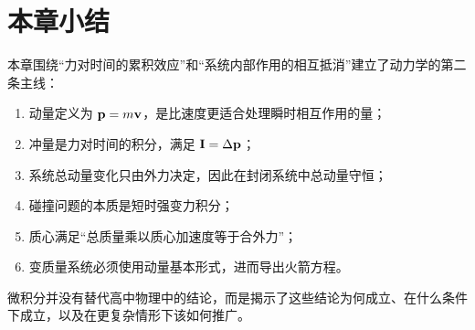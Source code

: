 \section*{本章小结}

本章围绕“力对时间的累积效应”和“系统内部作用的相互抵消”建立了动力学的第二条主线：
\begin{enumerate}
  \item 动量定义为 $\vb p=m\vb v$，是比速度更适合处理瞬时相互作用的量；
  \item 冲量是力对时间的积分，满足 $\vb I=\Delta\vb p$；
  \item 系统总动量变化只由外力决定，因此在封闭系统中总动量守恒；
  \item 碰撞问题的本质是短时强变力积分；
  \item 质心满足“总质量乘以质心加速度等于合外力”；
  \item 变质量系统必须使用动量基本形式，进而导出火箭方程。
\end{enumerate}
微积分并没有替代高中物理中的结论，而是揭示了这些结论为何成立、在什么条件下成立，以及在更复杂情形下该如何推广。

